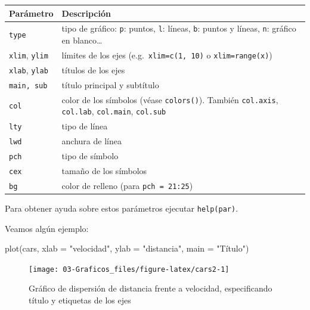 \documentclass[
]{book}
\newenvironment{Shaded}{\begin{snugshade}}{\end{snugshade}}
\newcommand{\AttributeTok}[1]{\textcolor[rgb]{0.77,0.63,0.00}{#1}}
\newcommand{\FunctionTok}[1]{\textcolor[rgb]{0.00,0.00,0.00}{#1}}
\newcommand{\NormalTok}[1]{#1}
\newcommand{\StringTok}[1]{\textcolor[rgb]{0.31,0.60,0.02}{#1}}
\theoremstyle{break}
\theoremstyle{nonumberplain}
\begin{document}
\begin{longtable}[]{@{}
  >{\raggedright\arraybackslash}p{}
  >{\raggedright\arraybackslash}p{}@{}}
\toprule
Parámetro & Descripción \\
\midrule
\endhead
\texttt{type} & tipo de gráfico:
\texttt{p}: puntos, \texttt{l}: líneas, \texttt{b}: puntos y líneas,
\texttt{n}: gráfico en blanco\ldots{} \\
\texttt{xlim}, \texttt{ylim} & límites de los ejes
(e.g.~\texttt{xlim=c(1,\ 10)} o \texttt{xlim=range(x)}) \\
\texttt{xlab}, \texttt{ylab} & títulos de los ejes \\
\texttt{main,\ sub} & título principal y subtítulo \\
\texttt{col} & color de los símbolos (véase \texttt{colors()}).
También \texttt{col.axis}, \texttt{col.lab}, \texttt{col.main}, \texttt{col.sub} \\
\texttt{lty} & tipo de línea \\
\texttt{lwd} & anchura de línea \\
\texttt{pch} & tipo de símbolo \\
\texttt{cex} & tamaño de los símbolos \\
\texttt{bg} & color de relleno (para \texttt{pch\ =\ 21:25}) \\
\bottomrule
\end{longtable}

Para obtener ayuda sobre estos parámetros ejecutar \texttt{help(par)}.

Veamos algún ejemplo:

\begin{Shaded}
\begin{Highlighting}[]
\FunctionTok{plot}\NormalTok{(cars, }\AttributeTok{xlab =} \StringTok{"velocidad"}\NormalTok{, }\AttributeTok{ylab =} \StringTok{"distancia"}\NormalTok{, }\AttributeTok{main =} \StringTok{"Título"}\NormalTok{)}
\end{Highlighting}
\end{Shaded}

\begin{figure}[!htb]

{\centering \texttt{[image: 03-Graficos\_files/figure-latex/cars2-1]} 

}

\caption{Gráfico de dispersión de distancia frente a velocidad, especificando título y etiquetas de los ejes}\label{fig:cars2}
\end{figure}
\end{document}
